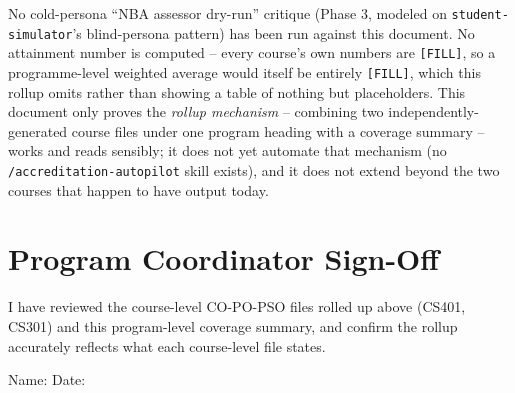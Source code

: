 \documentclass[11pt]{article}
\begin{document}
No cold-persona ``NBA assessor dry-run'' critique (Phase 3, modeled on \texttt{student-simulator}'s blind-persona pattern) has been run against this document. No attainment number is computed -- every course's own numbers are \texttt{[FILL]}, so a programme-level weighted average would itself be entirely \texttt{[FILL]}, which this rollup omits rather than showing a table of nothing but placeholders. This document only proves the \emph{rollup mechanism} -- combining two independently-generated course files under one program heading with a coverage summary -- works and reads sensibly; it does not yet automate that mechanism (no \texttt{/accreditation-autopilot} skill exists), and it does not extend beyond the two courses that happen to have output today.

\section{Program Coordinator Sign-Off}

I have reviewed the course-level CO-PO-PSO files rolled up above (CS401, CS301) and this program-level coverage summary, and confirm the rollup accurately reflects what each course-level file states.

\bigskip
\noindent Name: \underline{\hspace{6cm}} \hfill Date: \underline{\hspace{3cm}}
\end{document}

